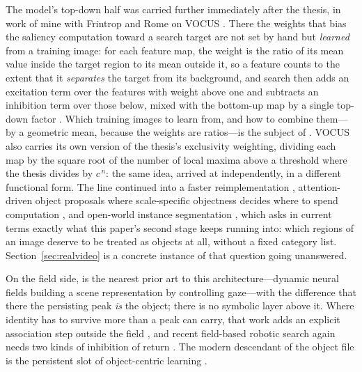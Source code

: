 \documentclass[11pt,a4paper]{article}
\begin{document}
The model's top-down half was carried further immediately after the thesis, in
work of mine with Frintrop and Rome on VOCUS \citep{frintrop2006}. There the
weights that bias the saliency computation toward a search target are not set by
hand but \emph{learned} from a training image: for each feature map, the weight
is the ratio of its mean value inside the target region to its mean outside it,
so a feature counts to the extent that it \emph{separates} the target from its
background, and search then adds an excitation term over the features with
weight above one and subtracts an inhibition term over those below, mixed with
the bottom-up map by a single top-down factor \citep{frintrop2005dagm}. Which
training images to learn from, and how to combine them---by a geometric mean,
because the weights are ratios---is the subject of \citet{frintrop2005ki}.
VOCUS also carries its own version of the thesis's exclusivity weighting,
dividing each map by the square root of the number of local maxima above a
threshold where the thesis divides by $c^{\,n}$: the same idea, arrived at
independently, in a different functional form. The line continued into a faster
reimplementation \citep{frintrop2015}, attention-driven object proposals where
scale-specific objectness decides where to spend computation
\citep{wilms2018}, and open-world instance segmentation \citep{wilms2024},
which asks in current terms exactly what this paper's second stage keeps running
into: which regions of an image deserve to be treated as objects at all, without
a fixed category list. Section~\ref{sec:realvideo} is a concrete instance of
that question going unanswered.

On the field side, \citet{zibner2011} is the nearest prior art
to this architecture---dynamic neural fields building a scene representation by
controlling gaze---with the difference that there the persisting peak \emph{is}
the object; there is no symbolic layer above it. Where identity has to survive
more than a peak can carry, that work adds an explicit association step outside
the field \citep{kamkar2022}, and recent field-based robotic search again needs
two kinds of inhibition of return \citep{grieben2024}. The modern descendant of
the object file is the persistent slot of object-centric learning
\citep{locatello2020,peters2021}.
\end{document}
